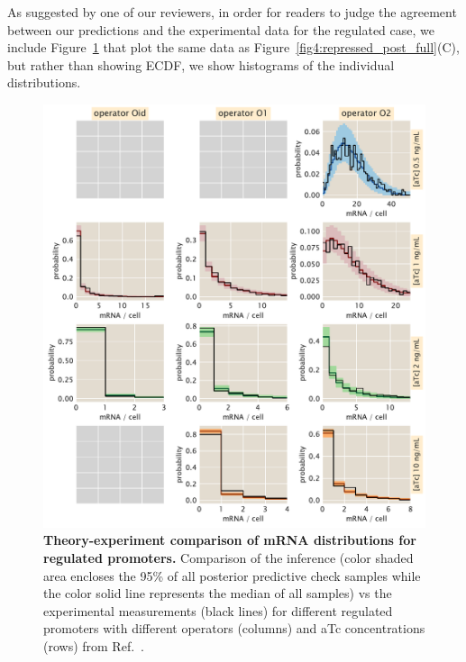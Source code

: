 As suggested by one of our reviewers, in order for readers to judge the
agreement between our predictions and the experimental data for the regulated
case, we include Figure~\ref{figS:reg_histograms} that plot the same data as
Figure~\ref{fig4:repressed_post_full}(C), but rather than showing ECDF, we show
histograms of the individual distributions.

\begin{figure}[p]
\centering
\includegraphics[width=\textwidth]{../../figures/si/figS0X_histograms.pdf}
\caption{\textbf{Theory-experiment comparison of mRNA distributions for
regulated promoters.} Comparison of the inference (color shaded area
encloses the 95\% of all posterior predictive check samples while the color
solid line represents the median of all samples) vs the experimental
measurements (black lines) for different regulated promoters with different
operators (columns) and aTc concentrations (rows) from
Ref.~\cite{Jones2014}.}
\label{figS:reg_histograms}
\end{figure}